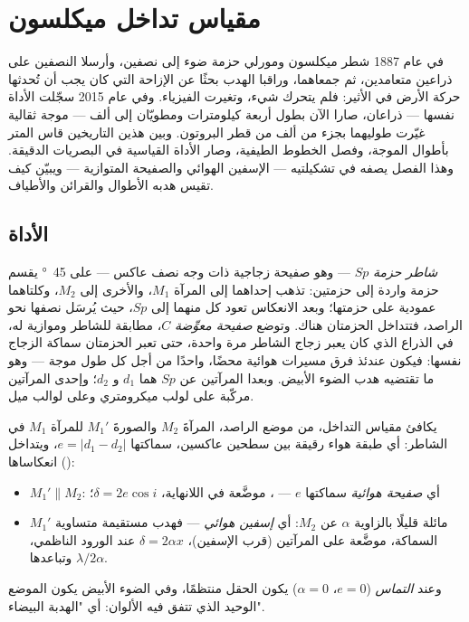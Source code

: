\chapter{مقياس تداخل ميكلسون}\label{ch:b2:michelson}

في عام 1887 شطر ميكلسون ومورلي حزمة ضوء إلى نصفين، وأرسلا
النصفين على ذراعين متعامدين، ثم جمعاهما، وراقبا
الهدب بحثًا عن الإزاحة التي كان يجب أن تُحدثها حركة الأرض في الأثير:
فلم يتحرك شيء، وتغيرت الفيزياء. وفي عام 2015 سجّلت الأداة
نفسها --- ذراعان، صارا الآن بطول أربعة كيلومترات ومطويّان إلى
ألف --- موجة ثقالية غيّرت طوليهما
بجزء من ألف من قطر البروتون. وبين هذين التاريخين قاس  المتر بأطوال الموجة، وفصل
الخطوط الطيفية، وصار الأداة القياسية في البصريات الدقيقة.
وهذا الفصل يصفه في تشكيلتيه --- الإسفين الهوائي
والصفيحة المتوازية --- ويبيّن كيف تقيس هدبه الأطوال
والقرائن والأطياف.

\section{الأداة}

\begin{definition}\label{def:b2:michelson:instrument}
\emph{شاطر حزمة} $Sp$ --- وهو صفيحة زجاجية ذات وجه نصف عاكس
--- على \qty{45}{\degree} يقسم حزمة واردة إلى حزمتين: تذهب إحداهما إلى
المرآة $M_1$، والأخرى إلى $M_2$، وكلتاهما عمودية على حزمتها؛ وبعد
الانعكاس تعود كل منهما إلى $Sp$، حيث يُرسَل نصفها نحو
الراصد، فتتداخل الحزمتان هناك. وتوضع \emph{صفيحة معوِّضة}
$C$، مطابقة للشاطر وموازية له، في الذراع
الذي كان يعبر زجاج الشاطر مرة واحدة، حتى تعبر
الحزمتان سماكة الزجاج نفسها: فيكون  عندئذ
فرق مسيرات هوائية محضًا، واحدًا من أجل كل طول موجة --- وهو ما
تقتضيه هدب الضوء الأبيض. وبعدا المرآتين عن $Sp$ هما $d_1$
و $d_2$؛ وإحدى المرآتين مركّبة على لولب ميكرومتري وعلى
لوالب ميل.
\end{definition}

\begin{proposition}\label{prop:b2:michelson:equivalent}
يكافئ مقياس التداخل، من موضع الراصد، المرآةَ
$M_2$ والصورةَ $M_1'$ للمرآة $M_1$ في الشاطر: أي طبقة هواء رقيقة
بين سطحين عاكسين، سماكتها $e = |d_1 - d_2|$، ويتداخل
انعكاساها ():
\begin{itemize}
  \item $M_1' \parallel M_2$: أي \emph{صفيحة هوائية} سماكتها $e$ --- ، موضَّعة في اللانهاية، $\delta = 2e\cos i$؛
  \item $M_1'$ مائلة قليلًا بالزاوية $\alpha$ عن $M_2$: أي \emph{إسفين هوائي}
        --- فهدب مستقيمة متساوية السماكة، موضَّعة على
        المرآتين (قرب الإسفين)، $\delta = 2\alpha x$ عند الورود الناظمي،
        وتباعدها $\lambda/2\alpha$.
\end{itemize}
وعند \emph{التماس} ($e = 0$، $\alpha = 0$) يكون الحقل منتظمًا، وفي الضوء
الأبيض يكون الموضع الوحيد الذي تتفق فيه الألوان: أي "الهدبة البيضاء".
\end{proposition}

